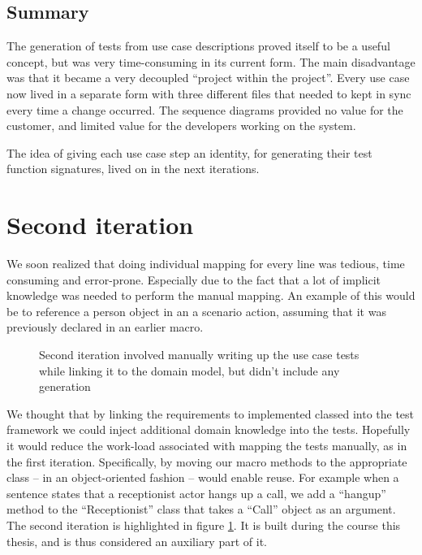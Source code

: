 \subsection{Summary}
The generation of tests from use case descriptions proved itself to be a useful concept, but was very time-consuming in its current form. The main disadvantage was that it became a very decoupled ``project within the project''. Every use case now lived in a separate form with three different files that needed to kept in sync every time a change occurred. The sequence diagrams provided no value for the customer, and limited value for the developers working on the system.\smallskip

\noindent The idea of giving each use case step an identity, for generating their test function signatures, lived on in the next iterations.

\section{Second iteration}
We soon realized that doing individual mapping for every line was tedious, time consuming and error-prone. Especially due to the fact that a lot of implicit knowledge was needed to perform the manual mapping. An example of this would be to reference a person object in an a scenario action, assuming that it was previously declared in an earlier macro.\medskip
\begin{figure}[!htbp]
\centering
{}
\caption{Second iteration involved manually writing up the use case tests while linking it to the domain model, but didn't include any generation}
\label{fig:project_parameter_plot_2nd_iteration}
\end{figure}
\noindent We thought that by linking the requirements to implemented classed into the test framework we could inject additional domain knowledge into the tests. Hopefully it would reduce the work-load associated with mapping the tests manually, as in the first iteration. Specifically, by moving our macro methods to the appropriate class -- in an object-oriented fashion -- would enable reuse. For example when a sentence states that a receptionist actor hangs up a call, we add a ``hangup'' method to the  ``Receptionist'' class that takes a ``Call'' object as an argument. The second iteration is highlighted in figure \ref{fig:project_parameter_plot_2nd_iteration}. It is built during the course this thesis, and is thus considered an auxiliary part of it.

